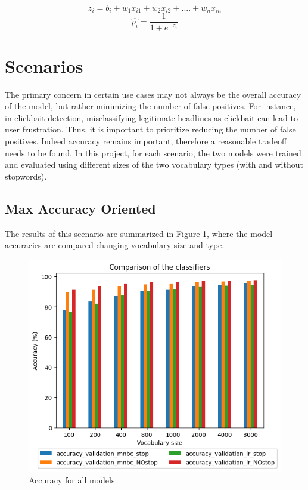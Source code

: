 \documentclass{article}
\begin{document}
\begin{multicols}{2}
\vspace{-0.2cm}
\begin{equation} \label{eq:funct}
    z_i = b_i + w_1x_{i1} + w_2x_{i2} + .... + w_nx_{in}
\end{equation}
\vspace{-0.2cm}
\begin{equation} \label{eq:prob}
    \hat{p_i}=\frac {1}{1+e^{-z_i}}
\end{equation}
\vspace{-0.65cm}


\section{Scenarios}

The primary concern in certain use cases may not always be the overall accuracy of the model, but rather minimizing the number of false positives. 
For instance, in clickbait detection, misclassifying legitimate headlines as clickbait can lead to user frustration. 
Thus, it is important to prioritize reducing the number of false positives. 
Indeed accuracy remains important, therefore a reasonable tradeoff needs to be found.
In this project, for each scenario, the two models were trained and evaluated using
different sizes of the two vocabulary types (with and without stopwords).

\subsection{Max Accuracy Oriented}
The results of this scenario are summarized in Figure \ref{ACC_all}, where the model accuracies are compared changing vocabulary size and type.

    \begin{figure}[H]
        \centering
        \includegraphics[width=1\columnwidth]{Figures/ACC_all.png}
        \caption{\footnotesize Accuracy for all models}
        \label{ACC_all}
    \end{figure}


\end{multicols}
\end{document}
